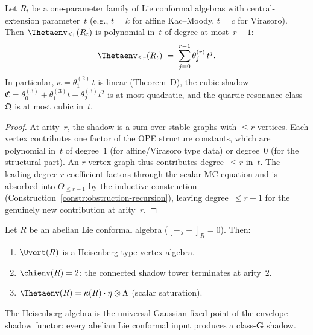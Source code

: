 \begin{proposition}
\label{prop:polynomial-level-dependence}
Let $R_t$ be a one-parameter family of Lie conformal algebras
with central-extension parameter~$t$ \textup{(}e.g., $t = k$
for affine Kac--Moody, $t = c$ for Virasoro\textup{)}.
Then $\Thetaenv_{\leq r}(R_t)$ is polynomial in~$t$ of
degree at most~$r{-}1$:
\begin{equation}\label{eq:polynomial-level}
\Thetaenv_{\leq r}(R_t)
\;=\;
\sum_{j=0}^{r-1} \theta_j^{(r)} \, t^j.
\end{equation}
In particular, $\kappa = \theta_1^{(2)} \, t$ is linear
\textup{(}Theorem~D\textup{)}, the cubic shadow
$\mathfrak{C} = \theta_0^{(3)} + \theta_1^{(3)} t +
\theta_2^{(3)} t^2$ is at most quadratic, and the quartic
resonance class~$\mathfrak{Q}$ is at most cubic in~$t$.
\end{proposition}

\begin{proof}
At arity~$r$, the shadow is a sum over stable graphs with
$\leq r$ vertices.  Each vertex contributes one factor of the
OPE structure constants, which are polynomial in~$t$ of
degree~$1$ (for affine/Virasoro type data) or degree~$0$
(for the structural part).  An $r$-vertex graph thus
contributes degree~$\leq r$ in~$t$.  The leading degree-$r$
coefficient factors through the scalar MC equation and is
absorbed into $\Theta_{\leq r-1}$ by the inductive
construction
(Construction~\ref{constr:obstruction-recursion}),
leaving degree~$\leq r{-}1$ for the genuinely new contribution
at arity~$r$.
\end{proof}

\begin{proposition}
\label{prop:gaussian-collapse-abelian}
Let $R$ be an abelian Lie conformal algebra
\textup{(}$[{-}_\lambda{-}]_R = 0$\textup{)}.  Then:
\begin{enumerate}[label=\textup{(\roman*)}]
\item $\Uvert(R)$ is a Heisenberg-type vertex algebra.
\item $\chienv(R) = 2$:
  the connected shadow tower terminates at arity~$2$.
\item $\Thetaenv(R) = \kappa(R) \cdot \eta \otimes \Lambda$
  \textup{(}scalar saturation\textup{)}.
\end{enumerate}
The Heisenberg algebra is the universal Gaussian fixed point
of the envelope-shadow functor: every abelian Lie conformal
input produces a class-$\mathbf{G}$ shadow.
\end{proposition}

